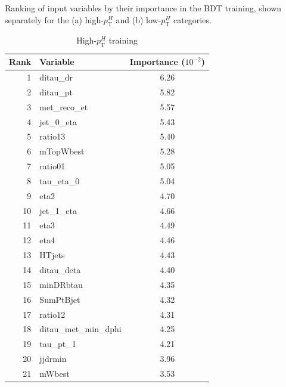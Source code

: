 \begin{table}[!htbp]
  \centering
  \scriptsize
  \caption{Ranking of input variables by their importance in the BDT training, shown separately for the (a) high-$p_{\mathrm{T}}^{H}$ and (b) low-$p_{\mathrm{T}}^{H}$ categories.}
  \renewcommand{\arraystretch}{1.05}
  \setlength{\tabcolsep}{2.5pt} %
  \begin{subtable}[t]{0.48\textwidth}
    \centering
    \begin{tabular}{r l c}
      \toprule
      \textbf{Rank} & \textbf{Variable} & \textbf{Importance} \tiny{($10^{-2}$)} \\
      \midrule
       1 & ditau\_dr               & 6.26 \\
       2 & ditau\_pt               & 5.82 \\
       3 & met\_reco\_et           & 5.57 \\
       4 & jet\_0\_eta             & 5.43 \\
       5 & ratio13                 & 5.40 \\
       6 & mTopWbest               & 5.28 \\
       7 & ratio01                 & 5.05 \\
       8 & tau\_eta\_0             & 5.04 \\
       9 & eta2                    & 4.70 \\
      10 & jet\_1\_eta               & 4.66 \\
      11 & eta3                    & 4.49 \\
      12 & eta4                    & 4.46 \\
      13 & HTjets                  & 4.43 \\
      14 & ditau\_deta              & 4.40 \\
      15 & minDRbtau               & 4.35 \\
      16 & SumPtBjet               & 4.32 \\
      17 & ratio12                 & 4.31 \\
      18 & ditau\_met\_min\_dphi      & 4.25 \\
      19 & tau\_pt\_1                & 4.21 \\
      20 & jjdrmin                 & 3.96 \\
      21 & mWbest                  & 3.53 \\
      \bottomrule
    \end{tabular}
    \caption{High-$p_{\mathrm{T}}^{H}$ training}

\end{subtable}
\end{table}
